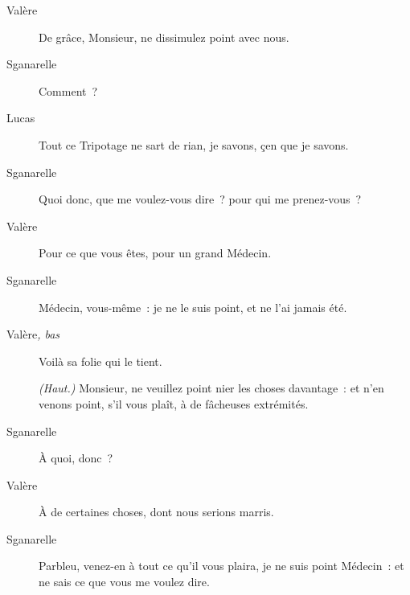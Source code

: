 \documentclass[french,twoside]{book} %
\begin{document}
 \begin{description} \item[Valère] 

De grâce, Monsieur, ne dissimulez point avec nous.\end{description}
 \begin{description} \item[Sganarelle] 

Comment ?\end{description}
 \begin{description} \item[Lucas] 

Tout ce Tripotage ne sart de rian, je savons, çen que je savons.\end{description}
 \begin{description} \item[Sganarelle] 

Quoi donc, que me voulez-vous dire ? pour qui me prenez-vous ?\end{description}
 \begin{description} \item[Valère] 

Pour ce que vous êtes, pour un grand Médecin.\end{description}
 \begin{description} \item[Sganarelle] 

Médecin, vous-même : je ne le suis point, et ne l’ai jamais été.\end{description}
 \begin{description} \item[Valère\textit{, bas}\par
] 

Voilà sa folie qui le tient.

\textit{(Haut.)} Monsieur, ne veuillez point nier les choses davantage : et n’en venons point, s’il vous plaît, à de fâcheuses extrémités.\end{description}
 \begin{description} \item[Sganarelle] 

À quoi, donc ?\end{description}
 \begin{description} \item[Valère] 

À de certaines choses, dont nous serions marris.\end{description}
 \begin{description} \item[Sganarelle] 

Parbleu, venez-en à tout ce qu’il vous plaira, je ne suis point Médecin : et ne sais ce que vous me voulez dire.\end{description}
\end{document}
